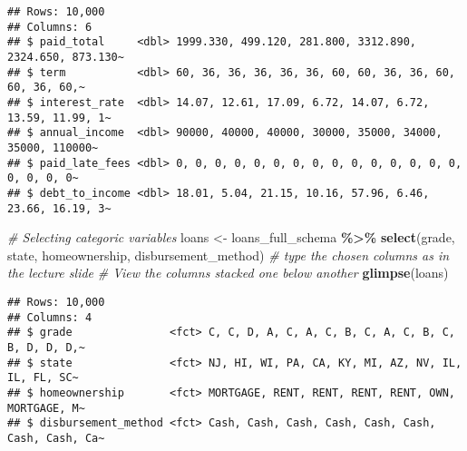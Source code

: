 \documentclass[
]{article}
\newenvironment{Shaded}{\begin{snugshade}}{\end{snugshade}}
\newcommand{\CommentTok}[1]{\textcolor[rgb]{0.56,0.35,0.01}{\textit{#1}}}
\newcommand{\FunctionTok}[1]{\textcolor[rgb]{0.13,0.29,0.53}{\textbf{#1}}}
\newcommand{\NormalTok}[1]{#1}
\newcommand{\OtherTok}[1]{\textcolor[rgb]{0.56,0.35,0.01}{#1}}
\newcommand{\SpecialCharTok}[1]{\textcolor[rgb]{0.81,0.36,0.00}{\textbf{#1}}}
\begin{document}
\begin{verbatim}
## Rows: 10,000
## Columns: 6
## $ paid_total     <dbl> 1999.330, 499.120, 281.800, 3312.890, 2324.650, 873.130~
## $ term           <dbl> 60, 36, 36, 36, 36, 36, 60, 60, 36, 36, 60, 60, 36, 60,~
## $ interest_rate  <dbl> 14.07, 12.61, 17.09, 6.72, 14.07, 6.72, 13.59, 11.99, 1~
## $ annual_income  <dbl> 90000, 40000, 40000, 30000, 35000, 34000, 35000, 110000~
## $ paid_late_fees <dbl> 0, 0, 0, 0, 0, 0, 0, 0, 0, 0, 0, 0, 0, 0, 0, 0, 0, 0, 0~
## $ debt_to_income <dbl> 18.01, 5.04, 21.15, 10.16, 57.96, 6.46, 23.66, 16.19, 3~
\end{verbatim}

\begin{Shaded}
\begin{Highlighting}[]
\CommentTok{\# Selecting categoric variables}
\NormalTok{loans }\OtherTok{\textless{}{-}}\NormalTok{ loans\_full\_schema }\SpecialCharTok{\%\textgreater{}\%} 
  \FunctionTok{select}\NormalTok{(grade, state, homeownership, disbursement\_method) }
\CommentTok{\# type the chosen columns as in the lecture slide}
\CommentTok{\# View the columns stacked one below another}
\FunctionTok{glimpse}\NormalTok{(loans)}
\end{Highlighting}
\end{Shaded}

\begin{verbatim}
## Rows: 10,000
## Columns: 4
## $ grade               <fct> C, C, D, A, C, A, C, B, C, A, C, B, C, B, D, D, D,~
## $ state               <fct> NJ, HI, WI, PA, CA, KY, MI, AZ, NV, IL, IL, FL, SC~
## $ homeownership       <fct> MORTGAGE, RENT, RENT, RENT, RENT, OWN, MORTGAGE, M~
## $ disbursement_method <fct> Cash, Cash, Cash, Cash, Cash, Cash, Cash, Cash, Ca~
\end{verbatim}
\end{document}

